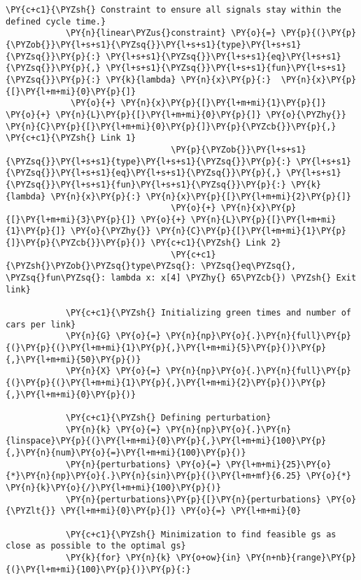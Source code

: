 \begin{Verbatim}[commandchars=\\\{\}]
            \PY{c+c1}{\PYZsh{} Constraint to ensure all signals stay within the defined cycle time.}
            \PY{n}{linear\PYZus{}constraint} \PY{o}{=} \PY{p}{(}\PY{p}{\PYZob{}}\PY{l+s+s1}{\PYZsq{}}\PY{l+s+s1}{type}\PY{l+s+s1}{\PYZsq{}}\PY{p}{:} \PY{l+s+s1}{\PYZsq{}}\PY{l+s+s1}{eq}\PY{l+s+s1}{\PYZsq{}}\PY{p}{,} \PY{l+s+s1}{\PYZsq{}}\PY{l+s+s1}{fun}\PY{l+s+s1}{\PYZsq{}}\PY{p}{:} \PY{k}{lambda} \PY{n}{x}\PY{p}{:}  \PY{n}{x}\PY{p}{[}\PY{l+m+mi}{0}\PY{p}{]}
             \PY{o}{+} \PY{n}{x}\PY{p}{[}\PY{l+m+mi}{1}\PY{p}{]} \PY{o}{+} \PY{n}{L}\PY{p}{[}\PY{l+m+mi}{0}\PY{p}{]} \PY{o}{\PYZhy{}} \PY{n}{C}\PY{p}{[}\PY{l+m+mi}{0}\PY{p}{]}\PY{p}{\PYZcb{}}\PY{p}{,} \PY{c+c1}{\PYZsh{} Link 1}
                                 \PY{p}{\PYZob{}}\PY{l+s+s1}{\PYZsq{}}\PY{l+s+s1}{type}\PY{l+s+s1}{\PYZsq{}}\PY{p}{:} \PY{l+s+s1}{\PYZsq{}}\PY{l+s+s1}{eq}\PY{l+s+s1}{\PYZsq{}}\PY{p}{,} \PY{l+s+s1}{\PYZsq{}}\PY{l+s+s1}{fun}\PY{l+s+s1}{\PYZsq{}}\PY{p}{:} \PY{k}{lambda} \PY{n}{x}\PY{p}{:} \PY{n}{x}\PY{p}{[}\PY{l+m+mi}{2}\PY{p}{]} 
                                 \PY{o}{+} \PY{n}{x}\PY{p}{[}\PY{l+m+mi}{3}\PY{p}{]} \PY{o}{+} \PY{n}{L}\PY{p}{[}\PY{l+m+mi}{1}\PY{p}{]} \PY{o}{\PYZhy{}} \PY{n}{C}\PY{p}{[}\PY{l+m+mi}{1}\PY{p}{]}\PY{p}{\PYZcb{}}\PY{p}{)} \PY{c+c1}{\PYZsh{} Link 2}
                                 \PY{c+c1}{\PYZsh{}\PYZob{}\PYZsq{}type\PYZsq{}: \PYZsq{}eq\PYZsq{}, \PYZsq{}fun\PYZsq{}: lambda x: x[4] \PYZhy{} 65\PYZcb{}) \PYZsh{} Exit link}
            
            \PY{c+c1}{\PYZsh{} Initializing green times and number of cars per link}
            \PY{n}{G} \PY{o}{=} \PY{n}{np}\PY{o}{.}\PY{n}{full}\PY{p}{(}\PY{p}{(}\PY{l+m+mi}{1}\PY{p}{,}\PY{l+m+mi}{5}\PY{p}{)}\PY{p}{,}\PY{l+m+mi}{50}\PY{p}{)}
            \PY{n}{X} \PY{o}{=} \PY{n}{np}\PY{o}{.}\PY{n}{full}\PY{p}{(}\PY{p}{(}\PY{l+m+mi}{1}\PY{p}{,}\PY{l+m+mi}{2}\PY{p}{)}\PY{p}{,}\PY{l+m+mi}{0}\PY{p}{)}
            
            \PY{c+c1}{\PYZsh{} Defining perturbation}
            \PY{n}{k} \PY{o}{=} \PY{n}{np}\PY{o}{.}\PY{n}{linspace}\PY{p}{(}\PY{l+m+mi}{0}\PY{p}{,}\PY{l+m+mi}{100}\PY{p}{,}\PY{n}{num}\PY{o}{=}\PY{l+m+mi}{100}\PY{p}{)}
            \PY{n}{perturbations} \PY{o}{=} \PY{l+m+mi}{25}\PY{o}{*}\PY{n}{np}\PY{o}{.}\PY{n}{sin}\PY{p}{(}\PY{l+m+mf}{6.25} \PY{o}{*} \PY{n}{k}\PY{o}{/}\PY{l+m+mi}{100}\PY{p}{)}
            \PY{n}{perturbations}\PY{p}{[}\PY{n}{perturbations} \PY{o}{\PYZlt{}} \PY{l+m+mi}{0}\PY{p}{]} \PY{o}{=} \PY{l+m+mi}{0}
            
            \PY{c+c1}{\PYZsh{} Minimization to find feasible gs as close as possible to the optimal gs}
            \PY{k}{for} \PY{n}{k} \PY{o+ow}{in} \PY{n+nb}{range}\PY{p}{(}\PY{l+m+mi}{100}\PY{p}{)}\PY{p}{:}
        

\end{Verbatim}
